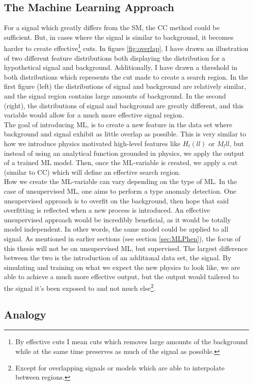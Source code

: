 \subsection{The Machine Learning Approach}
For a signal which greatly differs from the \ac{SM}, the \ac{CC} method could be sufficient. But, in 
cases where the signal is similar to background, it becomes harder to create effective\footnote{By effective
cuts I mean cuts which removes large amounts of the background while at the same time preserves as much of 
the signal as possible.} cuts. In figure \ref{fig:overlap}, I have drawn an illustration of two different feature distributions both 
displaying the distribution for a hypothetical signal and background. Additionally, I have drawn a 
threshold in both distributions which represents the cut made to create a search region. In the first 
figure (left) the distributions of signal and background are relatively similar, and the signal region 
contains large amounts of background. In the second (right), the distributions of signal and background 
are greatly different, and this variable would allow for a much more effective signal region. 
\\
The goal of introducing \ac{ML}, is to create a new feature in the data set where background and signal
exhibit as little overlap as possible. This is very similar to how we introduce physics motivated high-level
features like $H_t(ll)$ or $M_lll$, but instead of using an analytical function grounded in physics, 
we apply the output of a trained \ac{ML} model. Then, once the \ac{ML}-variable is created, 
we apply a cut (similar to \ac{CC}) which will define an effective search region. 
\\
How we create the \ac{ML}-variable can vary depending on the type of \ac{ML}. In the case of unsupervised 
\ac{ML}, one aims to perform a type anomaly detection. One unsupervised approach is to overfit on the background,
then hope that said overfitting is reflected when a new process is introduced. An effective unsupervised approach
would be incredibly beneficial, as it would be totally model independent. In other words, the same model could be applied 
to all signal. As mentioned in earlier sections (see section \ref{sec:MLPhen}), the focus of this thesis will not be on 
unsupervised \ac{ML}, but supervised. The largest difference between the two is the introduction of an additional data set,
the signal. By simulating and training on what we expect the new physics to look like, we are able to achieve a much more 
effective output, but the output would tailered to the signal it's been exposed to and not much else\footnote{Except for 
overlapping signals or models which are able to interpolate between regions.}.


\subsection{Analogy}
